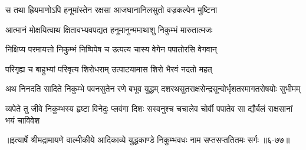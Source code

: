 \twolineshloka
{स तथा ह्रियमाणोऽपि हनूमांस्तेन रक्षसा}
{आजघानानिलसुतो वज्रकल्पेन मुष्टिना} %

\twolineshloka
{आत्मानं मोक्षयित्वाथ क्षितावभ्यवपद्यत}
{हनूमानुन्ममाथाशु निकुम्भं मारुतात्मजः} %

\twolineshloka
{निक्षिप्य परमायत्तो निकुम्भं निष्पिपेष च}
{उत्पत्य चास्य वेगेन पपातोरसि वेगवान्} %

\twolineshloka
{परिगृह्य च बाहुभ्यां परिवृत्य शिरोधराम्}
{उत्पाटयामास शिरो भैरवं नदतो महत्} %

\twolineshloka
{अथ निनदति सादिते निकुम्भे पवनसुतेन रणे बभूव युद्धम्}
{दशरथसुतराक्षसेन्द्रसून्वोर्भृशतरमागतरोषयोः सुभीमम्} %

\twolineshloka
{व्यपेते तु जीवे निकुम्भस्य हृष्टा विनेदुः प्लवंगा दिशः सस्वनुश्च}
{चचालेव चोर्वी पपातेव सा द्यौर्बलं राक्षसानां भयं चाविवेश} %


॥इत्यार्षे श्रीमद्रामायणे वाल्मीकीये आदिकाव्ये युद्धकाण्डे निकुम्भवधः नाम सप्तसप्ततितमः सर्गः ॥६-७७॥
